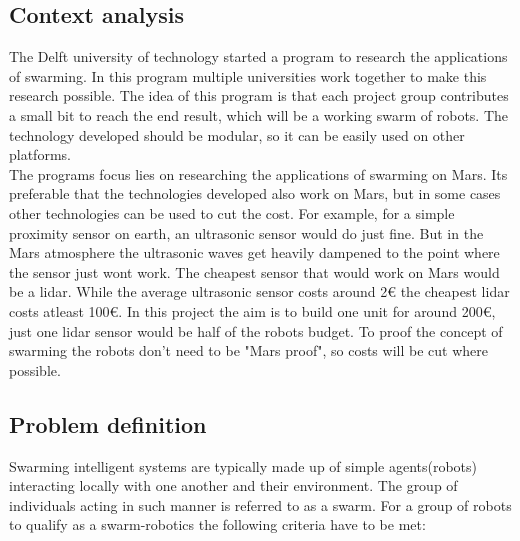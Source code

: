 \documentclass[10pt,a4paper]{article}
\begin{document}
\subsection{Context analysis}
The Delft university of technology started a program to research the applications of swarming. In this program multiple universities work together to make this research possible. The idea of this program is that each project group contributes a small bit to reach the end result, which will be a working swarm of robots. The technology developed should be modular, so it can be easily used on other platforms.\\The programs focus lies on researching the applications of swarming on Mars. Its preferable that the technologies developed also work on Mars, but in some cases other technologies can be used to cut the cost. For example, for a simple proximity sensor on earth, an ultrasonic sensor would do just fine. But in the Mars atmosphere the ultrasonic waves get heavily dampened to the point where the sensor just wont work\cite{soundonmars}. The cheapest sensor that would work on Mars would be a lidar\cite{lidarmars}. While the average ultrasonic sensor costs around 2$\euro$ the cheapest lidar costs atleast 100$\euro$. In this project the aim is to build one unit for around 200$\euro$, just one lidar sensor would be half of the robots budget. To proof the concept of swarming the robots don't need to be "Mars proof", so costs will be cut where possible.\\

\subsection{Problem definition}
Swarming intelligent systems are typically made up of simple agents(robots) interacting locally with one another and their environment. The group of individuals acting in such manner is referred to as a swarm\cite{swarmintelligence}. For a group of robots to qualify as a swarm-robotics the following criteria have to be met:
\end{document}
